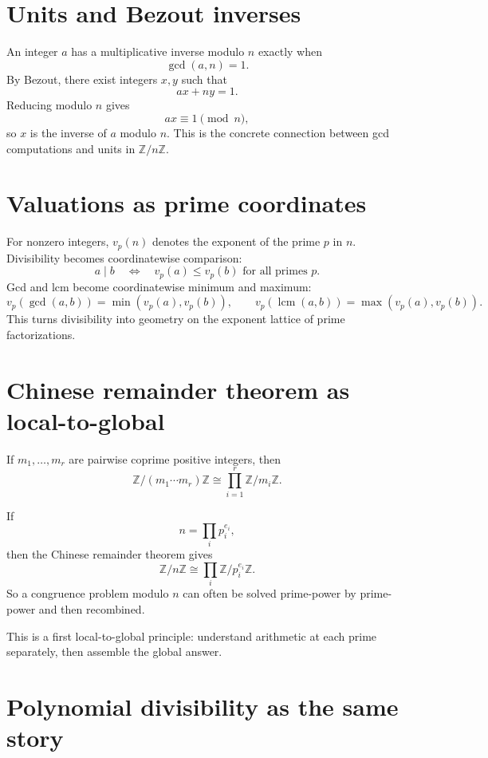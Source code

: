 \section{Units and Bezout inverses}

An integer \(a\) has a multiplicative inverse modulo \(n\) exactly when
\[
  \gcd(a,n)=1.
\]
By Bezout, there exist integers \(x,y\) such that
\[
  ax+ny=1.
\]
Reducing modulo \(n\) gives
\[
  ax\equiv1\pmod n,
\]
so \(x\) is the inverse of \(a\) modulo \(n\).  This is the concrete connection between gcd computations and units in \(\mathbb Z/n\mathbb Z\).

\section{Valuations as prime coordinates}

For nonzero integers, \(v_p(n)\) denotes the exponent of the prime \(p\) in \(n\).  Divisibility becomes coordinatewise comparison:
\[
  a\mid b\quad\Longleftrightarrow\quad
  v_p(a)\le v_p(b)\text{ for all primes }p.
\]
Gcd and lcm become coordinatewise minimum and maximum:
\[
  v_p(\gcd(a,b))=\min(v_p(a),v_p(b)),\qquad
  v_p(\operatorname{lcm}(a,b))=\max(v_p(a),v_p(b)).
\]
This turns divisibility into geometry on the exponent lattice of prime factorizations.

\section{Chinese remainder theorem as local-to-global}

\begin{theorem}
If \(m_1,\ldots,m_r\) are pairwise coprime positive integers, then
\[
  \mathbb Z/(m_1\cdots m_r)\mathbb Z\cong
  \prod_{i=1}^r \mathbb Z/m_i\mathbb Z.
\]
\end{theorem}


If
\[
  n=\prod_i p_i^{e_i},
\]
then the Chinese remainder theorem gives
\[
  \mathbb Z/n\mathbb Z\cong
  \prod_i \mathbb Z/p_i^{e_i}\mathbb Z.
\]
So a congruence problem modulo \(n\) can often be solved prime-power by prime-power and then recombined.

This is a first local-to-global principle: understand arithmetic at each prime separately, then assemble the global answer.

\section{Polynomial divisibility as the same story}


